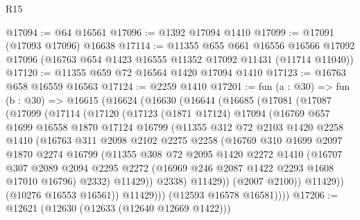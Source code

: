 \begin{lexlean}{R15}
\begin{coremodule}
@17094 := @64 @16561
@17096 := @1392 @17094 @1410
@17099 := @17091 (@17093 @17096) @16638
@17114 := @11355
    @655
    @661
    @16556
    @16566
    @17092
    @17096
    (@16763 @654 @1423 @16555 @11352 @17092 @11431 (@11714 @11040))
@17120 := @11355 @659 @72 @16564 @1420 @17094 @1410
@17123 := @16763 @658 @16559 @16563
@17124 := @2259 @1410
@17201 := fun (a : @30) =>
  fun (b : @30) =>
  @16615
    (@16624
      (@16630
        (@16644
          (@16685
            (@17081
              (@17087
                (@17099
                  (@17114
                    (@17120
                      (@17123
                        (@1871 @17124)
                        @17094
                        (@16769
                          @657
                          @1699
                          @16558
                          @1870
                          @17124
                          @16799
                          (@11355
                            @312
                            @72
                            @2103
                            @1420
                            @2258
                            @1410
                            (@16763
                              @311
                              @2098
                              @2102
                              @2275
                              @2258
                              (@16769
                                @310
                                @1699
                                @2097
                                @1870
                                @2274
                                @16799
                                (@11355
                                  @308
                                  @72
                                  @2095
                                  @1420
                                  @2272
                                  @1410
                                  (@16707
                                    @307
                                    @2089
                                    @2094
                                    @2295
                                    @2272
                                    (@16969 @246 @2087 @1422 @2293 @1608 @17010 @16796)
                                    @2332)
                                  @11429))
                              @2338)
                            @11429))
                        (@2007 @2100))
                      @11429))
                  (@10276 @16553 @16561))
                @11429)))
          (@12593 @16578 @16581))))
@17206 := @12621 (@12630 (@12633 (@12640 @12669 @1422)))

\end{coremodule}
\end{lexlean}
